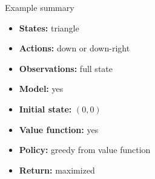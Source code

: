 \documentclass[11pt, aspectratio=169]{beamer}
\begin{document}
\begin{frame}{Example summary}
    \begin{itemize}
        \item \textbf{States:} triangle
        \item \textbf{Actions:} down or down-right
        \item \textbf{Observations:} full state
        \item \textbf{Model:} yes
        \item \textbf{Initial state:} $(0, 0)$
        \item \textbf{Value function:} yes
        \item \textbf{Policy:} greedy from value function
        \item \textbf{Return:} maximized
    \end{itemize}
\end{frame}
\end{document}
